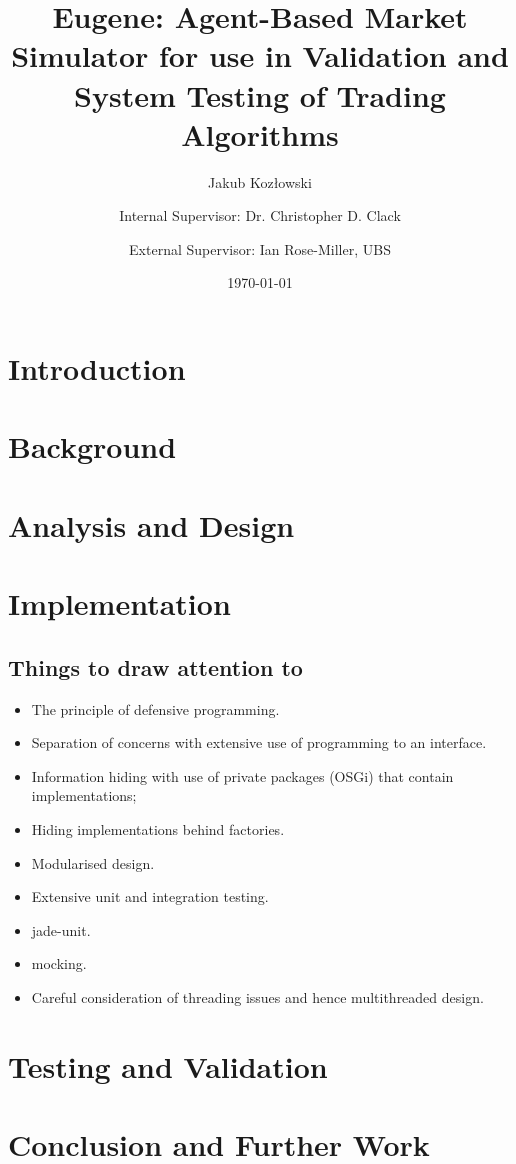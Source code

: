\documentclass[a4, 11pt]{report}
\title{\textbf{Eugene: Agent-Based Market Simulator for use in Validation and System Testing of Trading Algorithms}}
\author{Jakub Koz\l owski \and Internal Supervisor: Dr. Christopher D. Clack \and External Supervisor: Ian Rose-Miller, UBS}
\date{\today}
\begin{document}
\maketitle

\tableofcontents

\pagestyle{fancy}

\chapter{Introduction}
\label{introduction}





\chapter{Background}
\label{background}

\chapter{Analysis and Design}
\label{analysis-and-design}




\chapter{Implementation}
\label{implementation}

\section{Things to draw attention to}
\begin{itemize}
\item The principle of defensive programming.
\item Separation of concerns with extensive use of programming to an interface.
\item Information hiding with use of private packages (OSGi) that contain implementations;
\item Hiding implementations behind factories.
\item Modularised design.
\item Extensive unit and integration testing.
\item jade-unit.
\item mocking.
\item Careful consideration of threading issues and hence multithreaded design.

\end{itemize}


\chapter{Testing and Validation}
\label{testing}

\chapter{Conclusion and Further Work}
\label{conclusion}
\end{document}
